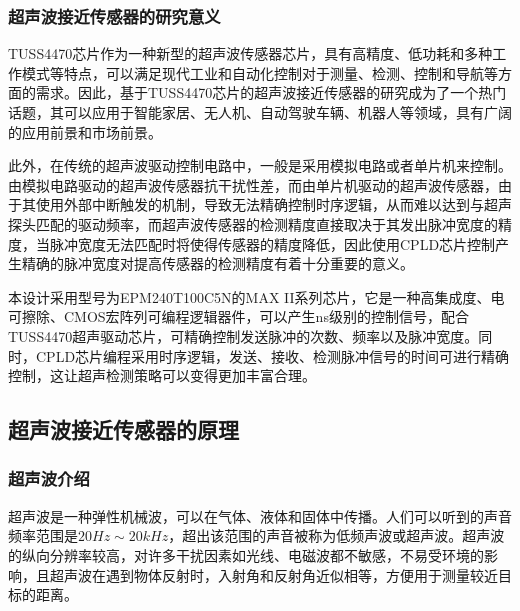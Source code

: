     \subsubsection{超声波接近传感器的研究意义}
    TUSS4470芯片作为一种新型的超声波传感器芯片，具有高精度、低功耗和多种工作模式等特点，可以满足现代工业和自动化控制对于测量、检测、控制和导航等方面的需求。因此，基于TUSS4470芯片的超声波接近传感器的研究成为了一个热门话题，其可以应用于智能家居、无人机、自动驾驶车辆、机器人等领域，具有广阔的应用前景和市场前景。\par
    此外，在传统的超声波驱动控制电路中，一般是采用模拟电路或者单片机来控制。由模拟电路驱动的超声波传感器抗干扰性差，而由单片机驱动的超声波传感器，由于其使用外部中断触发的机制，导致无法精确控制时序逻辑，从而难以达到与超声探头匹配的驱动频率，而超声波传感器的检测精度直接取决于其发出脉冲宽度的精度，当脉冲宽度无法匹配时将使得传感器的精度降低，因此使用CPLD芯片控制产生精确的脉冲宽度对提高传感器的检测精度有着十分重要的意义。\par
    本设计采用型号为EPM240T100C5N的MAX II系列芯片，它是一种高集成度、电可擦除、CMOS宏阵列可编程逻辑器件，可以产生ns级别的控制信号，配合TUSS4470超声驱动芯片，可精确控制发送脉冲的次数、频率以及脉冲宽度。同时，CPLD芯片编程采用时序逻辑，发送、接收、检测脉冲信号的时间可进行精确控制，这让超声检测策略可以变得更加丰富合理。
    \subsection{超声波接近传感器的原理}
    \subsubsection{超声波介绍}
      超声波是一种弹性机械波，可以在气体、液体和固体中传播。人们可以听到的声音频率范围是$20Hz\sim20kHz$，超出该范围的声音被称为低频声波或超声波。超声波的纵向分辨率较高，对许多干扰因素如光线、电磁波都不敏感，不易受环境的影响，且超声波在遇到物体反射时，入射角和反射角近似相等，方便用于测量较近目标的距离。
      
